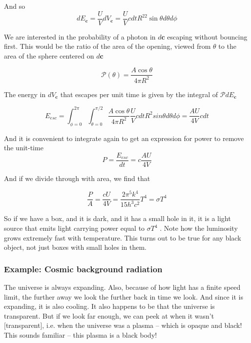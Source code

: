 \documentclass[10pt]{article}
\begin{document}
And so
\begin{equation}
dE_\mathbf{c} = \frac{U}{V} dV_\mathbf{c} = \frac{U}{V} cdt R^22 \sin \theta d\theta d\phi
\end{equation}

We are interested in the probability of a photon in $ d\mathbf{c} $ escaping without bouncing first. This would be the ratio of the area of the opening, viewed from $ \theta $ to the area of the sphere centered on $ d\mathbf{c} $ 


\begin{equation}
	\mathcal{P}(\theta) = \frac{A\cos\theta}{4\pi R^2}
\end{equation}

The energy in $ dV_\mathbf{c} $ that escapes per unit time is given by the integral of $ \mathcal{P}dE_\mathbf{c} $ 

\begin{equation}
	E_{esc} = \int_{\phi = 0}^{2\pi} \int_{\theta = 0}^{\pi /2} \frac{A\cos\theta}{4\pi R^2} \frac{U}{V} cdtR^2 sin\theta d\theta d\phi = \frac{AU}{4V} cdt
\end{equation}

And it is convenient to integrate again to get an expression for power to remove the unit-time
\begin{equation}
	P = \frac{E_{esc}}{dt} = c \frac{AU}{4V}
\end{equation}

And if we divide through with area, we find that  

\begin{equation}
	\frac{P}{A} = \frac{cU}{4V} = \frac{2\pi^5k^4}{15h^3c^2}T^4 = \sigma T^4
\end{equation}

So if we have a box, and it is dark, and it has a small hole in it, it is a light source that emits light carrying power equal to $ \sigma T^4 $ .
Note how the luminosity grows extremely fast with temperature.
This turns out to be true for any black object, not just boxes with small holes in them.

\subsubsection{Example: Cosmic background radiation}

The universe is always expanding. 
Also, because of how light has a finite speed limit, the further away we look the further back in time we look.
And since it is expanding, it is also cooling. It also happens to be that the universe is transparent. But if we look far enough, we can peek at when it wasn't [transparent], i.e. when the universe was a plasma -- which is opaque and black! 
This sounds familiar -- this plasma is a black body!
\end{document}
